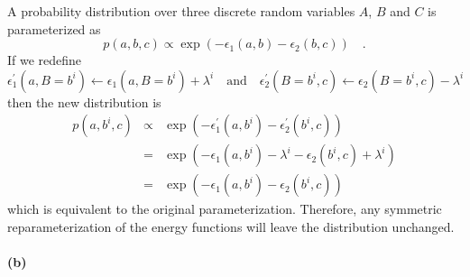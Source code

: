 \documentclass[11pt]{article}
\newcommand{\pr}[1]{\ensuremath{p(#1)}}
\begin{document}
A probability distribution over three discrete random variables $A$, $B$ and
$C$ is parameterized as
\begin{equation}
    \pr{a,b,c} \propto \exp \left ( - \epsilon_1 (a,b) -
        \epsilon_2 (b,c) \right ) \quad .
\end{equation}
If we redefine
\begin{equation}
    \epsilon_1^\prime (a,B=b^i) \gets \epsilon_1 (a,B=b^i) + \lambda^i \quad
    \mathrm{and} \quad
    \epsilon_2^\prime (B=b^i, c) \gets \epsilon_2 (B=b^i,c) - \lambda^i
\end{equation}
then the new distribution is
\begin{eqnarray}
    \pr{a,b^i,c} &\propto& \exp \left ( - \epsilon_1^\prime (a,b^i) -
        \epsilon_2^\prime (b^i,c) \right ) \\
    &=& \exp \left ( - \epsilon_1 (a,b^i) - \lambda^i -
        \epsilon_2 (b^i,c) + \lambda^i \right ) \\
    &=& \exp \left ( - \epsilon_1 (a,b^i) -
        \epsilon_2 (b^i,c) \right )
\end{eqnarray}
which is equivalent to the original parameterization. Therefore, any
symmetric reparameterization of the energy functions will leave the
distribution unchanged.

\paragraph{(b)}
\end{document}
